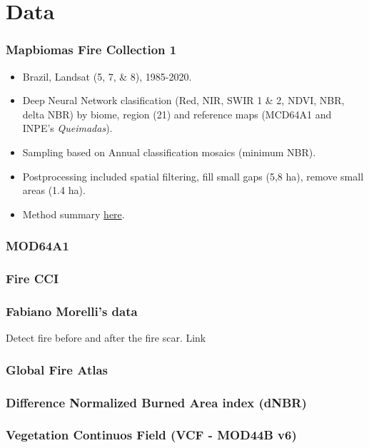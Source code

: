 \documentclass{beamer}
\begin{document}
\section{Data}

\begin{frame}
    \frametitle{Mapbiomas Fire Collection 1}
    \begin{itemize}
        \item Brazil, Landsat (5, 7, \& 8), 1985-2020.
        \item Deep Neural Network clasification (Red, NIR, SWIR 1 \& 2, NDVI, 
            NBR, delta NBR) by biome, region (21) and 
            reference maps (MCD64A1 and INPE's \textit{Queimadas}).
        \item Sampling based on Annual classification mosaics (minimum NBR).
        \item Postprocessing included spatial filtering, fill small gaps (5,8 
            ha), remove small areas (1.4 ha).
        \item Method summary 
            \href{https://mapbiomas.org/en/mapbiomas-fire-method}{here}.
    \end{itemize}
\end{frame}

\begin{frame}
    \frametitle{MOD64A1}
\end{frame}

\begin{frame}
    \frametitle{Fire CCI}
\end{frame}

\begin{frame}
    \frametitle{Fabiano Morelli's data}
    Detect fire before and after the fire scar. 
    Link 
\end{frame}

\begin{frame}
    \frametitle{Global Fire Atlas}
\end{frame}

\begin{frame}
    \frametitle{Difference Normalized Burned Area index (dNBR)}
\end{frame}

\begin{frame}
    \frametitle{Vegetation Continuos Field (VCF - MOD44B v6)}
\end{frame}
\end{document}
